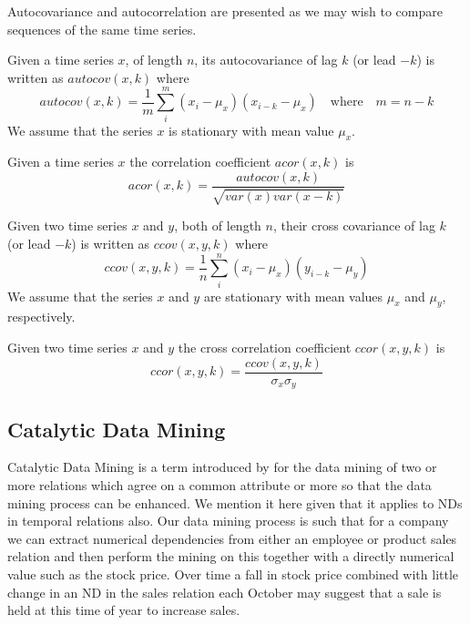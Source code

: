 Autocovariance and autocorrelation are presented as we may wish to
compare sequences of the same time series.

\begin{definition}[Autocovariance]\label{def:autocovar}
\begin{rm}
Given a time series $x$, of length $n$, its autocovariance of lag $k$
(or lead $-k$) is written as $autocov(x,k)$ where
\[
autocov(x,k) = \frac{1}{m} \sum_i^m (x_i - \mu_x) (x_{i-k} -
\mu_{x})\quad\mbox{where}\quad m = n-k 
\]
We assume that the series $x$ is stationary with mean value $\mu_x$.
\end{rm}
\end{definition}


\begin{definition}\label{def:autocorrel}
\begin{rm}
Given a time series $x$ the correlation coefficient $acor(x,k)$ is
\[
acor(x,k) = \frac{autocov(x,k)}{\sqrt{var(x)var(x-k)}}
\]
\end{rm}
\end{definition}


\begin{definition}\label{def:crosscovar}
\begin{rm}
Given two time series $x$ and $y$, both of length $n$, their
cross covariance of lag $k$
(or lead $-k$) is written as $ccov(x,y,k)$ where
\[
ccov(x,y,k) = \frac{1}{n} \sum_i^n (x_i - \mu_x) (y_{i-k} - \mu_y)
\]
We assume that the series $x$ and $y$ are stationary with mean values
$\mu_x$ and $\mu_y$, respectively.
\end{rm}
\end{definition}
 
 
\begin{definition}\label{def:crosscorrel}
\begin{rm}
Given two time series $x$ and $y$ the cross correlation coefficient $ccor(x,y,k)
$ is
\[
ccor(x,y,k) = \frac{ccov(x,y,k)}{\sigma_x \sigma_y}
\]
\end{rm}
\end{definition}

\subsection{Catalytic Data Mining}\label{subsec:tl_catdm}

Catalytic Data Mining is a term introduced by \cite{hs94} for the data
mining of two or more relations which agree on a common attribute or
more so that the data mining process can be enhanced. We mention it
here given that it applies to NDs in temporal relations also. Our data
mining process is such that for a company we can extract numerical
dependencies from either an employee or product sales relation and
then perform the mining on this together with a directly numerical
value such as the stock price. Over time a fall in stock price
combined with little change in an ND in the sales relation each
October may suggest that a sale is held at this time of year to
increase sales.

